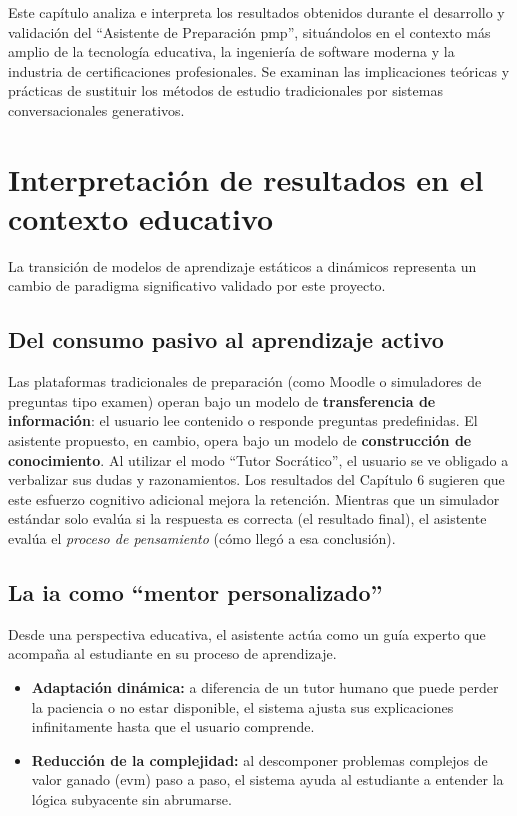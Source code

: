 Este capítulo analiza e interpreta los resultados obtenidos durante el desarrollo y validación del \enquote{Asistente de Preparación \gls{pmp}}, situándolos en el contexto más amplio de la tecnología educativa, la ingeniería de software moderna y la industria de certificaciones profesionales. Se examinan las implicaciones teóricas y prácticas de sustituir los métodos de estudio tradicionales por sistemas conversacionales generativos.

\section{Interpretación de resultados en el contexto educativo}

La transición de modelos de aprendizaje estáticos a dinámicos representa un cambio de paradigma significativo validado por este proyecto.

\subsection{Del consumo pasivo al aprendizaje activo}
Las plataformas tradicionales de preparación (como Moodle o simuladores de preguntas tipo examen) operan bajo un modelo de \textbf{transferencia de información}: el usuario lee contenido o responde preguntas predefinidas. El asistente propuesto, en cambio, opera bajo un modelo de \textbf{construcción de conocimiento}.
Al utilizar el modo \enquote{Tutor Socrático}, el usuario se ve obligado a verbalizar sus dudas y razonamientos. Los resultados del Capítulo 6 sugieren que este esfuerzo cognitivo adicional mejora la retención. Mientras que un simulador estándar solo evalúa si la respuesta es correcta (el resultado final), el asistente evalúa el \textit{proceso de pensamiento} (cómo llegó a esa conclusión).

\subsection{La \gls{ia} como \enquote{mentor personalizado}}
Desde una perspectiva educativa, el asistente actúa como un guía experto que acompaña al estudiante en su proceso de aprendizaje.
\begin{itemize}
\item   \textbf{Adaptación dinámica:} a diferencia de un tutor humano que puede perder la paciencia o no estar disponible, el sistema ajusta sus explicaciones infinitamente hasta que el usuario comprende.
\item   \textbf{Reducción de la complejidad:} al descomponer problemas complejos de valor ganado (\gls{evm}) paso a paso, el sistema ayuda al estudiante a entender la lógica subyacente sin abrumarse.
\end{itemize}


